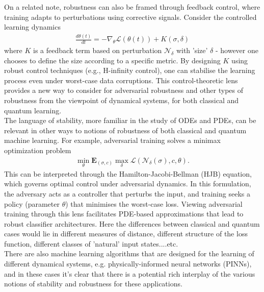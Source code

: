 \documentclass[onecolumn,prx, superscriptaddress,longbibliography,margin=1mm 11pt]{revtex4-2}
\renewcommand{\mathbf}[1]{\boldsymbol{#1}}
\begin{document}
On a related note, robustness can also be framed through feedback control, where training adapts to perturbations using corrective signals. Consider the controlled learning dynamics
\begin{align}
    \frac{d \theta(t)}{dt}=-\nabla_{\theta} \mathcal{L}(\theta(t))+K(\sigma, \delta)
\end{align}
where $K$ is a feedback term based on perturbation $\mathcal{N}_{\delta}$ with 'size' $\delta$ - however one chooses to define the size according to a specific metric. By designing 
$K$ using robust control techniques (e.g., H-infinity control), one can stabilise the learning process even under worst-case data corruptions. This control-theoretic lens provides a new way to consider for adversarial robustness and other types of robustness from the viewpoint of dynamical systems, for both classical and quantum learning.\\

The language of stability, more familiar in the study of ODEs and PDEs, can be relevant in other ways to notions of robustness of both classical and quantum machine learning. For example, adversarial training solves a minimax optimization problem
\begin{align}
    \min_{\theta} \mathbf{E}_{(\sigma,c)} \max_{\delta} \mathcal{L}(\mathcal{N}_{\delta}(\sigma), c, \theta).
\end{align}
This can be interpreted through the Hamilton-Jacobi-Bellman (HJB) equation, which governs optimal control under adversarial dynamics. In this formulation, the adversary acts as a controller that perturbs the input, and training seeks a policy (parameter $\theta$) that minimises the worst-case loss. Viewing adversarial training through this lens facilitates PDE-based approximations that lead to robust classifier architectures. Here the differences between classical and quantum cases would lie in different measures of distance, different structure of the loss function, different classes of 'natural' input states....etc. \\

There are also machine learning algorithms that are designed for the learning of different dynamical systems, e.g. physically-informed neural networks (PINNs), and in these cases it's clear that there is a potential rich interplay of the various notions of stability and robustness for these applications. 
\end{document}
